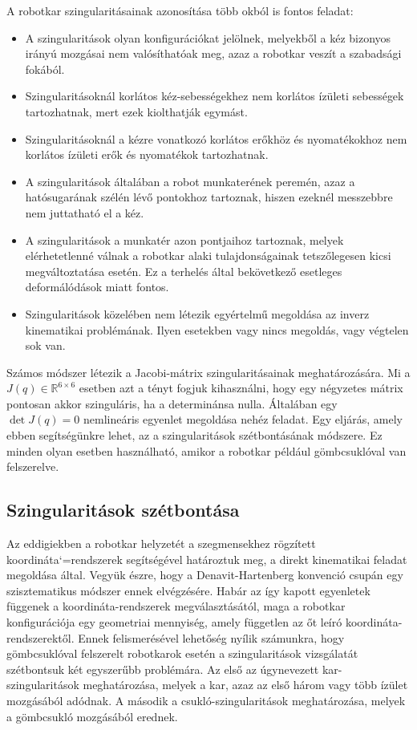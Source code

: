 \documentclass[12pt,a4paper]{report}
\theoremstyle{remark}
\theoremstyle{definition}
\begin{document}
A robotkar szingularitásainak azonosítása több okból is fontos feladat:
\begin{itemize}
\item A szingularitások olyan konfigurációkat jelölnek, melyekből a kéz bizonyos irányú mozgásai nem valósíthatóak 
    meg, azaz a robotkar veszít a szabadsági fokából.
\item Szingularitásoknál korlátos kéz-sebességekhez nem korlátos ízületi sebességek tartozhatnak, mert ezek 
    kiolthatják egymást.
\item Szingularitásoknál a kézre vonatkozó korlátos erőkhöz és nyomatékokhoz nem korlátos ízületi erők és nyomatékok 
    tartozhatnak.
\item A szingularitások általában a robot munkaterének peremén, azaz a hatósugarának szélén lévő pontokhoz 
    tartoznak, hiszen ezeknél messzebbre nem juttatható el a kéz.
\item A szingularitások a munkatér azon pontjaihoz tartoznak, melyek elérhetetlenné válnak a robotkar alaki 
    tulajdonságainak tetszőlegesen kicsi megváltoztatása esetén. Ez a terhelés által bekövetkező esetleges 
    deformálódások miatt fontos.
\item Szingularitások közelében nem létezik egyértelmű megoldása az inverz kinematikai problémának. Ilyen esetekben 
    vagy nincs megoldás, vagy végtelen sok van.
\end{itemize}

Számos módszer létezik a Jacobi-mátrix szingularitásainak meghatározására. Mi a $J(q) \in \mathbb{R}^{6 \times 6}$ 
esetben azt a tényt fogjuk kihasználni, hogy egy négyzetes mátrix pontosan akkor szinguláris, ha a determinánsa 
nulla. Általában egy $\det J(q) = 0$ nemlineáris egyenlet megoldása nehéz feladat. Egy eljárás, amely ebben 
segítségünkre lehet, az a szingularitások szétbontásának módszere. Ez minden olyan esetben használható, amikor a 
robotkar például gömbcsuklóval van felszerelve.

\subsection{Szingularitások szétbontása}
Az eddigiekben a robotkar helyzetét a szegmensekhez rögzített koordináta`=rendszerek segítségével határoztuk meg, a 
direkt kinematikai feladat megoldása által. Vegyük észre, hogy a Denavit-Hartenberg konvenció csupán egy 
szisztematikus módszer ennek elvégzésére. Habár az így kapott egyenletek függenek a koordináta-rendszerek 
megválasztásától, maga a robotkar konfigurációja egy geometriai mennyiség, amely független az őt leíró 
koordináta-rendszerektől. Ennek felismerésével lehetőség nyílik számunkra, hogy gömbcsuklóval felszerelt robotkarok 
esetén a szingularitások vizsgálatát szétbontsuk két egyszerűbb problémára. Az első az úgynevezett 
kar-szingularitások meghatározása, melyek a kar, azaz az első három vagy több ízület mozgásából adódnak. A második a 
csukló-szingularitások meghatározása, melyek a gömbcsukló mozgásából erednek.
\end{document}
